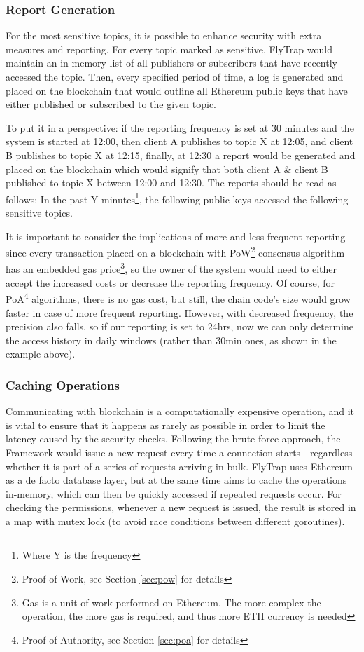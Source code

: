 \subsubsection{Report Generation}\label{sec:reports}
For the most sensitive topics, it is possible to enhance security with extra measures and reporting. For every topic marked as sensitive, FlyTrap would maintain an in-memory list of all publishers or subscribers that have recently accessed the topic. Then, every specified period of time, a log is generated and placed on the blockchain that would outline all Ethereum public keys that have either published or subscribed to the given topic.

To put it in a perspective: if the reporting frequency is set at 30 minutes and the system is started at 12:00, then client A publishes to topic  X at 12:05, and client B publishes to topic X at 12:15, finally, at 12:30 a report would be generated and placed on the blockchain which would signify that both client A \& client B published to topic X between 12:00 and 12:30. The reports should be read as follows: In the past Y minutes\footnote{Where Y is the frequency}, the following public keys accessed the following sensitive topics. 

It is important to consider the implications of more and less frequent reporting - since every transaction placed on a blockchain with PoW\footnote{Proof-of-Work, see Section \ref{sec:pow} for details} consensus algorithm has an embedded gas price\footnote{Gas is a unit of work performed on Ethereum. The more complex the operation, the more gas is required, and thus more ETH currency is needed}, so the owner of the system would need to either accept the increased costs or decrease the reporting frequency. Of course, for PoA\footnote{Proof-of-Authority, see Section \ref{sec:poa} for details} algorithms, there is no gas cost, but still, the chain code's size would grow faster in case of more frequent reporting. However, with decreased frequency, the precision also falls, so if our reporting is set to 24hrs, now we can only determine the access history in daily windows (rather than 30min ones, as shown in the example above).
\subsubsection{Caching Operations}
Communicating with blockchain is a computationally expensive operation, and it is vital to ensure that it happens as rarely as possible in order to limit the latency caused by the security checks. Following the brute force approach, the Framework would issue a new request every time a connection starts - regardless whether it is part of a series of requests arriving in bulk. FlyTrap uses Ethereum as a de facto database layer, but at the same time aims to cache the operations in-memory, which can then be quickly accessed if repeated requests occur. For checking the permissions, whenever a new request is issued, the result is stored in a map with mutex lock (to avoid race conditions between different goroutines).


